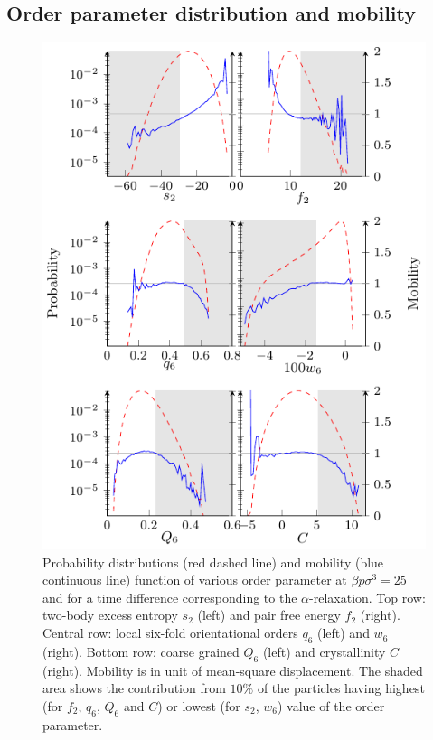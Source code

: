 \documentclass[twocolumn,superscriptaddress]{revtex4}
\begin{document}
\subsection{Order parameter distribution and mobility}\label{sec:order_parameters}

\begin{figure}
	\centering
	\includegraphics{fig_distrib}
	\caption{Probability distributions (red dashed line) and mobility (blue continuous line) function of various order parameter at $\beta p\sigma^3=25$ and for a time difference corresponding to the $\alpha$-relaxation. Top row: two-body excess entropy $s_2$ (left) and pair free energy $f_2$ (right). Central row: local six-fold orientational orders $q_6$ (left) and $w_6$ (right). Bottom row: coarse grained $Q_6$ (left) and crystallinity $C$ (right). Mobility is in unit of mean-square displacement. The shaded area shows the contribution from $10\%$ of the particles having highest (for $f_2$, $q_6$, $Q_6$ and $C$) or lowest (for $s_2$, $w_6$) value of the order parameter.}
	\label{fig:distrib}
\end{figure}
\end{document}
